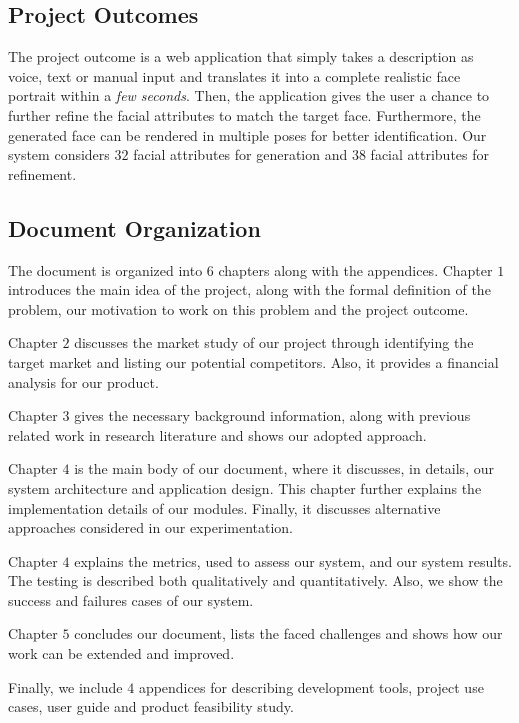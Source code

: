 \subsection{Project Outcomes}
The project outcome is a web application that simply takes a description as voice, text or manual input and translates it into a complete realistic face portrait within a \emph{few seconds}. Then, the application gives the user a chance to further refine the facial attributes to match the target face. Furthermore, the generated face can be rendered in multiple poses for better identification. Our system considers $32$ facial attributes for generation and $38$ facial attributes for refinement.

\subsection{Document Organization}
The document is organized into $6$ chapters along with the appendices. Chapter $1$ introduces the main idea of the project, along with the formal definition of the problem, our motivation to work on this problem and the project outcome.

Chapter $2$ discusses the market study of our project through identifying the target market and listing our potential competitors. Also, it provides a financial analysis for our product.

Chapter $3$ gives the necessary background information, along with previous related work in research literature and shows our adopted approach.

Chapter $4$ is the main body of our document, where it discusses, in details, our system architecture and application design. This chapter further explains the implementation details of our modules. Finally, it discusses alternative approaches considered in our experimentation.

Chapter $4$ explains the metrics, used to assess our system, and our system results. The testing is described both qualitatively and quantitatively. Also, we show the success and failures cases of our system.

Chapter $5$ concludes our document, lists the faced challenges and shows how our work can be extended and improved.

Finally, we include $4$ appendices for describing development tools, project use cases, user guide and product feasibility study.
